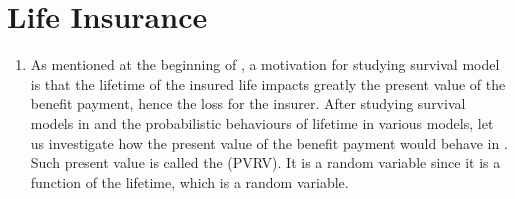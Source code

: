 \section{Life Insurance}
\label{sect:life-insurance}
\begin{enumerate}
\item As mentioned at the beginning of , a motivation
for studying survival model is that the lifetime of the insured life impacts
greatly the present value of the benefit payment, hence the loss for the
insurer. After studying survival models in  and the
probabilistic behaviours of lifetime in various models, let us investigate how
the present value of the benefit payment would behave in
. Such present value is called the  (PVRV). It is a random variable since it is a function
of the lifetime, which is a random variable.

\end{enumerate}

